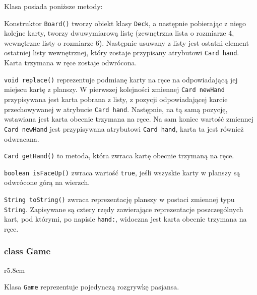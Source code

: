 \documentclass{article}
\begin{document}
Klasa posiada poniższe metody:

Konstruktor \texttt{Board()} tworzy obiekt klasy \texttt{Deck}, a następnie pobierając z niego kolejne karty, tworzy dwuwymiarową listę (zewnętrzna lista o rozmiarze 4, wewnętrzne listy o rozmiarze 6). Następnie usuwany z listy jest ostatni element ostatniej listy wewnętrznej, który zostaje przypisany atrybutowi \texttt{Card hand}. Karta trzymana w ręce zostaje odwrócona.

\texttt{void replace()} reprezentuje podmianę karty na ręce na odpowiadającą jej miejscu kartę z planszy. W pierwszej kolejności zmiennej \texttt{Card newHand} przypisywana jest karta pobrana z listy, z pozycji odpowiadającej karcie przechowywanej w atrybucie \texttt{Card hand}. Następnie, na tą samą pozycję, wstawiana jest karta obecnie trzymana na ręce. Na sam koniec wartość zmiennej \texttt{Card newHand} jest przypisywana atrybutowi \texttt{Card hand}, karta ta jest również odwracana.

\texttt{Card getHand()} to metoda, która zwraca kartę obecnie trzymaną na ręce.

\texttt{boolean isFaceUp()} zwraca wartość \texttt{true}, jeśli wszyskie karty w planszy są odwrócone górą na wierzch.

\texttt{String toString()} zwraca reprezentację planszy w postaci zmiennej typu \texttt{String}. Zapisywane są cztery rzędy zawierające reprezentacje poszczególnych kart, pod którymi, po napisie \texttt{hand:}, widoczna jest karta obecnie trzymana na ręce.

\subsubsection*{class Game}

\begin{wrapfigure}{r}{5.8cm}
\end{wrapfigure}


Klasa \texttt{Game} reprezentuje pojedynczą rozgrywkę pasjansa.
\end{document}
